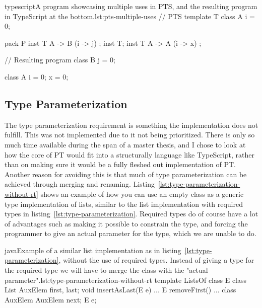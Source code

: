 \begin{code}{typescript}{A program showcasing multiple uses in PTS, and the resulting program in TypeScript at the bottom.}{lst:pts-multiple-uses}
    // PTS
    template T {
        class A {
            i = 0;
        }
    }

    pack P {
        inst T { A -> B (i -> j) };
        inst T;
        inst T { A -> A (i -> x) };
    }

    // Resulting program
    class B {
        j = 0;
    }

    class A {
        i = 0;
        x = 0;
    }
\end{code}

\subsection{Type Parameterization}\label{subsec:pts-type-parameterization}

The type parameterization requirement is something the implementation does not fulfill.
This was not implemented due to it not being prioritized.
There is only so much time available during the span of a master thesis, and I chose to look at how the core of PT would fit into a structurally language like TypeScript, rather than on making sure it would be a fully fleshed out implementation of PT\@.
Another reason for avoiding this is that much of type parameterization can be achieved through merging and renaming.
Listing~\vref{lst:type-parameterization-without-rt} shows an example of how you can use an empty class as a generic type implementation of lists, similar to the list implementation with required types in listing~\vref{lst:type-parameterization}.
Required types do of course have a lot of advantages such as making it possible to constrain the type, and forcing the programmer to give an actual parameter for the type, which we are unable to do.

\begin{code}{java}{Example of a similar list implementation as in listing~\vref{lst:type-parameterization}, without the use of required types. Instead of giving a type for the required type we will have to merge the class  with the "actual parameter".}{lst:type-parameterization-without-rt}
    template ListsOf {
        class E { }
        class List {
            AuxElem first, last;
            void insertAsLast(E e) { ... }
            E removeFirst() { ... }
        }
        class AuxElem {
            AuxElem next;
            E e;
        }
    }
\end{code}

